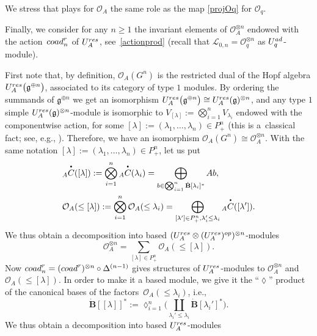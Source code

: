 \documentclass[11pt]{article}
\numberwithin{equation}{section}
\numberwithin{equation}{section}
\theoremstyle{definition}
\newcommand{\Ll}{{\mathcal L}}
\newcommand{\Oo}{{\mathcal O}}
\newcommand{\smallbullet}{%
\vcenter{\hbox{\,\scalebox{0.5}{$\bullet$}\,}}
}
\begin{document}
We stress that \smash{${}_A \overset{\smallbullet}{\tau}_{\mu,\nu}$} plays for $\Oo_A$ the same role as the map \eqref{projOq} for $\Oo_q$.

Finally, we consider for any $n\geq 1$ the invariant elements of $\Oo_A^{\otimes n}$ endowed with the action~${\rm coad}^r_n$ of $U_A^{\rm res}$, see~\eqref{actionprod} \big(recall that $\Ll_{0,n}=\Oo_q^{\otimes n}$ as $U_q^{\rm ad}$-module\big).

First note that, by definition, $\Oo_A(G^n)$ is the restricted dual of the Hopf algebra $U_A^{\rm res}\big(\mathfrak{g}^{\oplus n}\big)$, associated to its category of type $1$ modules. By ordering the summands of $\mathfrak{g}^{\oplus n}$ we get an isomorphism $U_A^{\rm res}\big(\mathfrak{g}^{\oplus n}\big)\cong U_A^{\rm res}(\mathfrak{g})^{\otimes n}$, and any type $1$ simple $U_A^{\rm res}(\mathfrak{g})^{\otimes n}$-module is isomorphic to ${V_{[\lambda]} := \bigotimes_{i=1}^n V_{\lambda_i}}$ endowed with the componentwise action, for some ${[\lambda] :=(\lambda_1,\dots, \lambda_n)\in P_+^n}$ (this is a~classical fact; see, e.g., \cite[Theorem~3.10.2]{Et}). Therefore, we have an isomorphism ${\Oo_A(G^n)\cong \Oo_A^{\otimes n}}$.
With the same notation $[\lambda]:=(\lambda_1,\dots, \lambda_n)\in P_+^n$, let us put
\begin{align*}%
&{}_A \overset{\raisebox{-1.5pt}{\scriptsize$\smallbullet$}}{C} ([\lambda]) := \bigotimes_{i=1}^n {}_A \overset{\raisebox{-1.5pt}{\scriptsize$\smallbullet$}}{C} (\lambda_i) = \bigoplus_{b\in \bigotimes_{i=1}^n \dot{\mathbf{B}}[\lambda_i]^*} Ab,\\
&\Oo_A(\leq [\lambda]) := \bigotimes_{i=1}^n \Oo_A(\leq \lambda_i)=\bigoplus_{[\lambda'] \in P_+^n, \lambda_i'\leq \lambda_i} {}_A \overset{\raisebox{-1.5pt}{\scriptsize$\smallbullet$}}{C} ([\lambda']).
\end{align*}
We thus obtain a decomposition into based $(U_A^{\rm res}\otimes (U_A^{\rm res})^{\rm op})^{\otimes n}$-modules
\[%
\Oo_A^{\otimes n} = \sum_{[\lambda] \in P_+^n} \Oo_A(\leq [\lambda]).
\]
Now ${\rm coad}_n^r = ({\rm coad}^r)^{\otimes n}\circ \Delta^{(n-1)}$ gives structures of $U_A^{\rm res}$-modules to $\Oo_A^{\otimes n}$ and $\Oo_A(\leq [\lambda])$. In order to make it a based module, we give it the ``$\lozenge$'' product of the canonical bases of the factors~${\Oo_A(\leq \lambda_i)}$, i.e.,
\[\dot{\mathbf{B}} [[\lambda]]^* := \lozenge_{i=1}^n \bigg(\coprod_{\lambda_i'\leq \lambda_i}\dot{\mathbf{B}} [\lambda_i']^*\bigg).\]
We thus obtain a decomposition into based $U_A^{\rm res}$-modules
\end{document}

